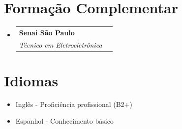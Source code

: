 \documentclass[letterpaper,11pt]{article}
\makeatletter
\newcommand{\resumeItem}[1]{
  \item\small{
    {#1 \vspace{-2pt}}
  }
}
\newcommand{\resumeSubheading}[4]{
  \vspace{-2pt}\item
    \begin{tabular*}{1.0\textwidth}[t]{l@{\extracolsep{\fill}}r}
      \textbf{#1} & \textbf{\small #2} \\
      \textit{\small#3} & \textit{\small #4} \\
    \end{tabular*}\vspace{-7pt}
}
\newcommand{\resumeSubHeadingListStart}{\begin{itemize}[leftmargin=0.0in, label={}]}
\newcommand{\resumeSubHeadingListEnd}{\end{itemize}}
\makeatother
\begin{document}
\section{Formação Complementar}
  \resumeSubHeadingListStart
    \resumeSubheading
      {Senai São Paulo}{}
      {Técnico em Eletroeletrônica}{}
  \resumeSubHeadingListEnd
\vspace{-10pt}

\section{Idiomas}
  \resumeSubHeadingListStart
    \resumeItem{Inglês - Proficiência profissional (B2+)}
    \resumeItem{Espanhol - Conhecimento básico}
  \resumeSubHeadingListEnd
\vspace{-10pt}
\end{document}
